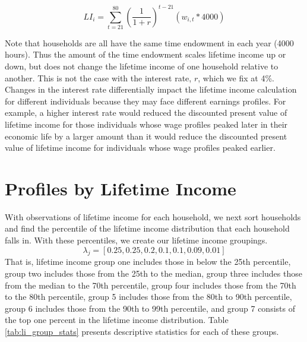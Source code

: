   \begin{equation}\label{eqn:LI}
    LI_{i} = \sum_{t=21}^{80}\left(\frac{1}{1+r}\right)^{t-21}(w_{i,t}*4000)
  \end{equation}

  \noindent\noindent Note that households are all have the same time endowment in each year (4000 hours).  Thus the amount of the time endowment scales lifetime income up or down, but does not change the lifetime income of one household relative to another. This is not the case with the interest rate, $r$, which we fix at 4\%. Changes in the interest rate differentially impact the lifetime income calculation for different individuals because they may face different earnings profiles. For example, a higher interest rate would reduced the discounted present value of lifetime income for those individuals whose wage profiles peaked later in their economic life by a larger amount than it would reduce the discounted present value of lifetime income for individuals whose wage profiles peaked earlier.


\section{Profiles by Lifetime Income}

  With observations of lifetime income for each household, we next sort households and find the percentile of the lifetime income distribution that each household falls in.  With these percentiles, we create our lifetime income groupings.
  \begin{equation}\label{EqLfEarnLambda_j}
    \lambda_{j}=[0.25, 0.25, 0.2, 0.1, 0.1, 0.09, 0.01]
  \end{equation}
  That is, lifetime income group one includes those in below the 25th percentile, group two includes those from the 25th to the median, group three includes those from the median to the 70th percentile, group four includes those from the 70th to the 80th percentile, group 5 includes those from the 80th to 90th percentile, group 6 includes those from the 90th to 99th percentile, and group 7 consists of the top one percent in the lifetime income distribution.  Table \ref{tab:li_group_stats} presents descriptive statistics for each of these groups.

